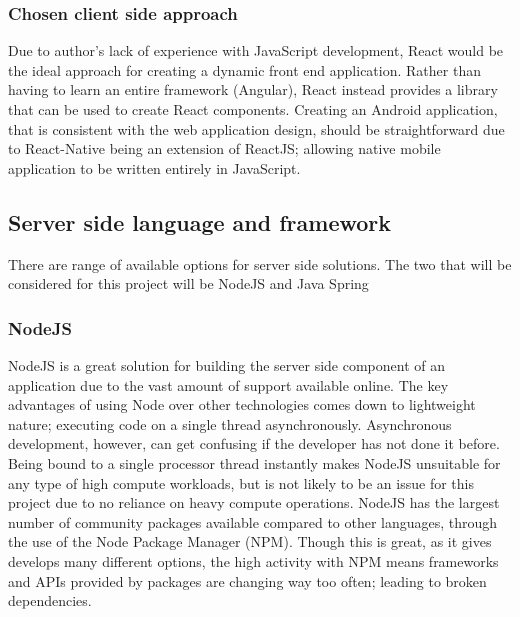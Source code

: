 \subsubsection*{Chosen client side approach}
Due to author's lack of experience with JavaScript development, React would be the ideal approach for creating a dynamic front end application.
Rather than having to learn an entire framework (Angular), React instead provides a library that can be used to create React components.
Creating an Android application, that is consistent with the web application design, should be straightforward due to React-Native
being an extension of ReactJS; allowing native mobile application to be written entirely in JavaScript.


\subsection{Server side language and framework}
There are range of available options for server side solutions.
The two that will be considered for this project will be NodeJS and Java Spring 

\subsubsection*{NodeJS}
NodeJS is a great solution for building the server side component of an application due to the vast amount of support available online.
The key advantages of using Node over other technologies comes down to lightweight nature; executing code on a single thread asynchronously.
Asynchronous development, however, can get confusing if the developer has not done it before.
Being bound to a single processor thread instantly makes NodeJS unsuitable for any type of high compute workloads, but is not likely to be an 
issue for this project due to no reliance on heavy compute operations.
NodeJS has the largest number of community packages available compared to other languages, through the use of the Node Package Manager (NPM).
Though this is great, as it gives develops many different options, the high activity with NPM means frameworks and APIs provided by packages
are changing way too often; leading to broken dependencies.

